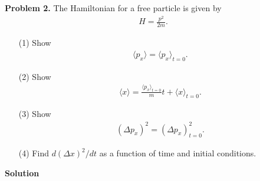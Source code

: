 \documentclass[floatfix,nofootinbib,superscriptaddress,fleqn]{revtex4}
\begin{document}
\noindent \textbf{Problem 2.} 
The Hamiltonian for a free particle is given by
\begin{align*}
H  = \frac{p^2}{2m}.
\end{align*}
\begin{itemize}
\item[(1)] Show 
  \begin{align*}
    \langle p_x \rangle = \langle p_x\rangle_{t=0}.
  \end{align*}
\item[(2)] Show 
  \begin{align*}
    \langle x \rangle = \frac{\langle p_x\rangle_{t=0}}{m} t + \langle
    x \rangle_{t=0}.
  \end{align*}
\item[(3)] Show 
  \begin{align*}
(\Delta p_x)^2 =  (\Delta p_x)_{t=0}^2  .
  \end{align*}
\item[(4)] Find $d(\Delta x)^2/dt$ as a function of time and initial 
  conditions. 
\end{itemize}
\noindent \textbf{Solution}
\end{document}
